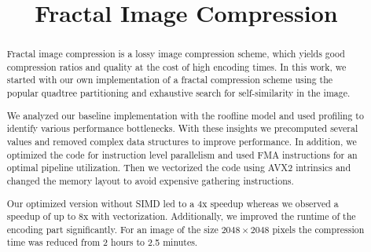 \documentclass[letterpaper]{article}
\title{Fractal Image Compression}
\begin{document}
%
\maketitle
%
%

\setlength{\abovedisplayskip}{1ex}
\setlength{\belowdisplayskip}{1ex}

\begin{abstract}
    Fractal image compression is a lossy image compression scheme,
    which yields good compression ratios and quality at the cost of high encoding times. 
    In this work, we started with our own implementation of a fractal compression scheme using the popular
    quadtree partitioning and exhaustive search for self-similarity in the image.

    We analyzed our baseline implementation with the roofline model and used profiling to identify various 
    performance bottlenecks. With these insights we precomputed several values and removed complex
    data structures to improve performance. In addition, we optimized the code for instruction level 
    parallelism and used FMA instructions for an optimal pipeline utilization. Then we vectorized the code 
    using AVX2 intrinsics and changed the memory layout to avoid expensive gathering instructions. 

    Our optimized version without SIMD led to a 4x speedup whereas we observed a speedup of up to 8x 
    with vectorization. Additionally, we improved the runtime of the encoding part significantly. For an
    image of the size $2048 \times 2048$ pixels the compression time was reduced from 2 hours to 
    2.5 minutes. 
\end{abstract}










\end{document}
